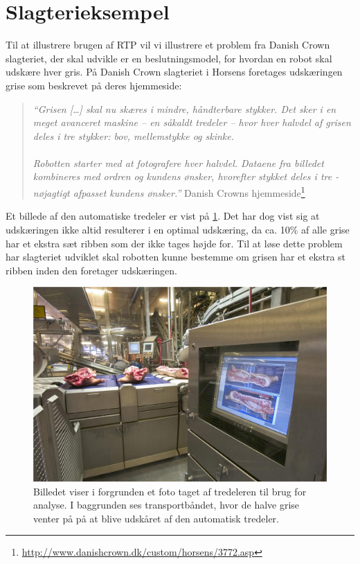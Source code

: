 \section{Slagterieksempel}
Til at illustrere brugen af RTP vil vi illustrere et  problem fra Danish Crown slagteriet, der skal  udvikle er en beslutningsmodel, for hvordan en robot skal  udskære hver gris. På Danish Crown slagteriet i Horsens foretages udskæringen  grise som beskrevet på deres hjemmeside:

\begin{quote}\textit{``Grisen [\ldots] skal nu skæres i mindre, håndterbare stykker. Det sker i en meget avanceret maskine -- en såkaldt tredeler -- hvor hver halvdel af grisen deles i tre stykker: bov, mellemstykke og skinke. \\ 
\\
Robotten starter med at fotografere hver halvdel. Dataene fra billedet kombineres med ordren og kundens ønsker, hvorefter stykket deles i tre - nøjagtigt afpasset kundens ønsker.''}{ Danish Crowns hjemmeside\footnote{\url{http://www.danishcrown.dk/custom/horsens/3772.asp}}}\end{quote}

Et billede af den automatiske tredeler er vist  på \cref{fig:pig}.  Det har dog vist sig at udskæringen ikke  altid resulterer i en  optimal udskæring, da  ca. 10\% af alle grise har et ekstra sæt ribben som der ikke tages højde for. Til at løse dette problem har slagteriet udviklet skal robotten kunne bestemme om grisen har et ekstra st ribben inden den foretager udskæringen.

\begin{figure}
 \begin{center}
  \includegraphics[scale=0.5]{images/209690-1}
	\caption{Billedet viser i forgrunden  et foto taget af tredeleren til brug for analyse. I baggrunden ses transportbåndet, hvor de halve  grise venter på på at blive udskåret af den automatisk tredeler.}
	\label{fig:pig}
\end{center}
\end{figure}


